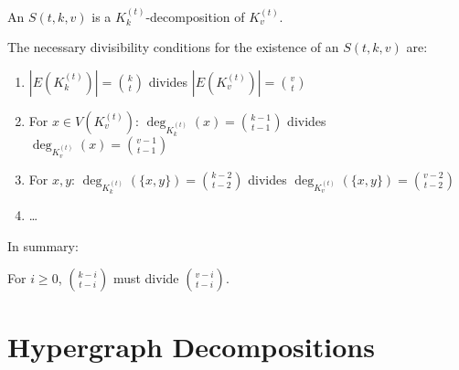 \begin{frame}

\begin{lemma}
An $S(t, k, v)$ is a $K_{k}^{(t)}$-decomposition of $K_{v}^{(t)}$.
\end{lemma}

\pause

The necessary divisibility conditions for the existence of an $S(t, k, v)$ are:

\begin{enumerate}
    \item $|E(K_k^{(t)})| = {k \choose t}$ divides $|E(K_v^{(t)})| = {v \choose t}$
    \pause
    \item For $x \in V(K_v^{(t)})$: $\deg_{K_k^{(t)}}(x) = {k-1 \choose t-1}$
    divides $\deg_{K_v^{(t)}}(x) = {v-1 \choose t-1}$
    \pause
    \item For $x, y$: $\deg_{K_k^{(t)}}(\{x, y\}) = {k-2 \choose t-2}$
    divides $\deg_{K_v^{(t)}}(\{x, y\}) = {v-2 \choose t-2}$
    \pause
    \item \ldots
\end{enumerate}

\pause
In summary:

For $i \geq 0$, ${k-i \choose t-i}$ must divide ${v-i \choose t-i}$.

\end{frame}

\section{Hypergraph Decompositions}
\subsection{}

